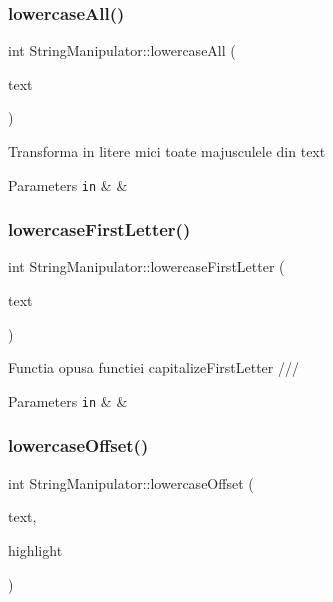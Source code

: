 \subsubsection{\texorpdfstring{lowercase\+All()}{lowercaseAll()}}
{\footnotesize\ttfamily int String\+Manipulator\+::lowercase\+All (\begin{DoxyParamCaption}\item[{Q\+String \&}]{text }\end{DoxyParamCaption})\hspace{0.3cm}{\ttfamily [static]}}

Transforma in litere mici toate majusculele din text


\begin{DoxyParams}[1]{Parameters}
\mbox{\tt in}  & {\em } & \\
\hline
\end{DoxyParams}
\mbox{\label{class_string_manipulator_a09536b194993d10f361459873c727c3b}} 
\subsubsection{\texorpdfstring{lowercase\+First\+Letter()}{lowercaseFirstLetter()}}
{\footnotesize\ttfamily int String\+Manipulator\+::lowercase\+First\+Letter (\begin{DoxyParamCaption}\item[{Q\+String \&}]{text }\end{DoxyParamCaption})\hspace{0.3cm}{\ttfamily [static]}}

Functia opusa functiei capitalize\+First\+Letter /// 
\begin{DoxyParams}[1]{Parameters}
\mbox{\tt in}  & {\em } & \\
\hline
\end{DoxyParams}
\mbox{\label{class_string_manipulator_ad8075d783befd76e2f456ff1ada8b0f6}} 
\subsubsection{\texorpdfstring{lowercase\+Offset()}{lowercaseOffset()}}
{\footnotesize\ttfamily int String\+Manipulator\+::lowercase\+Offset (\begin{DoxyParamCaption}\item[{Q\+String \&}]{text,  }\item[{const \hyperlink{class_text_high_light}{Text\+High\+Light} \&}]{highlight }\end{DoxyParamCaption})\hspace{0.3cm}{\ttfamily [static]}}

